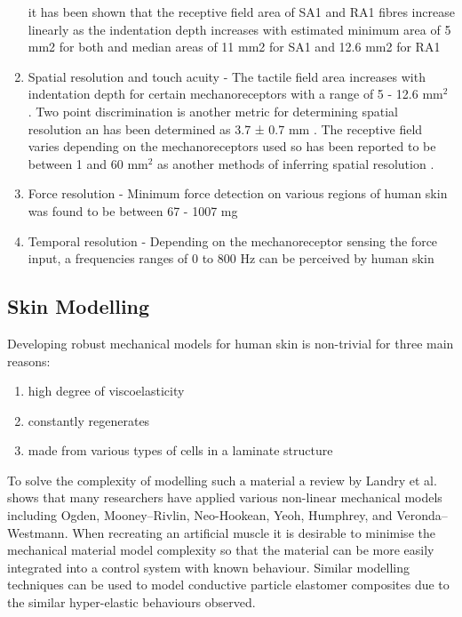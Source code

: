 \begin{enumerate}
it has been shown that the receptive field area of SA1 and RA1 fibres increase linearly as the indentation depth increases with estimated minimum area of 5 mm2 for both and median areas of 11 mm2 for SA1 and 12.6 mm2 for RA1
    \item Spatial resolution and touch acuity - The tactile field area increases with indentation depth for certain mechanoreceptors with a range of 5 - 12.6 mm$^2$ \cite{Deflorio2022}. Two point discrimination is another metric for determining spatial resolution an has been determined as 3.7 ± 0.7 mm \cite{Yokota2020}. The receptive field varies depending on the mechanoreceptors used so has been reported to be between 1 and 60 mm$^2$ as another methods of inferring spatial resolution \cite{Roudaut2012}.
    \item Force resolution - Minimum force detection on various regions of human skin was found to be between 67 - 1007 mg \cite{Ackerley2014}
    \item Temporal resolution - Depending on the mechanoreceptor sensing the force input, a frequencies ranges of 0 to 800 Hz can be perceived by human skin \cite{Deflorio2022}
\end{enumerate}


\subsection{Skin Modelling}
Developing robust mechanical models for human skin is non-trivial for three main reasons:
\begin{enumerate}
    \item high degree of viscoelasticity
    \item constantly regenerates
    \item made from various types of cells in a laminate structure 
\end{enumerate}
To solve the complexity of modelling such a material a review by Landry et al.\cite{Landry2021} shows that many researchers have applied various non-linear mechanical models including Ogden, Mooney–Rivlin, Neo-Hookean, Yeoh, Humphrey, and Veronda–Westmann. When recreating an artificial muscle it is desirable to minimise the mechanical material model complexity so that the material can be more easily integrated into a control system with known behaviour. Similar modelling techniques can be used to model conductive particle elastomer composites due to the similar hyper-elastic behaviours observed.



